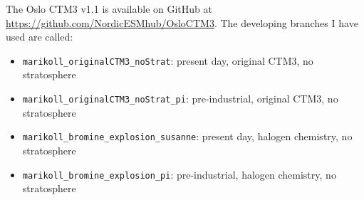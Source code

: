 The Oslo CTM3 v1.1 is available on GitHub at \url{https://github.com/NordicESMhub/OsloCTM3}. The developing branches I have used are called:

\begin{itemize}
    \item \texttt{marikoll\_originalCTM3\_noStrat}: present day, original CTM3, no stratosphere 
    \item \texttt{marikoll\_originalCTM3\_noStrat\_pi}: pre-industrial, original CTM3, no stratosphere
    \item \texttt{marikoll\_bromine\_explosion\_susanne}: present day, halogen chemistry, no stratosphere
    \item \texttt{marikoll\_bromine\_explosion\_pi}: pre-industrial, halogen chemistry, no stratosphere
\end{itemize}


